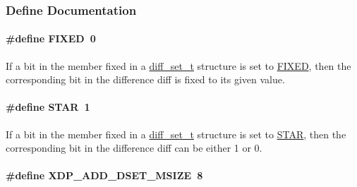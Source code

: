 \subsubsection{\-Define \-Documentation}
\hypertarget{xdp-add-diff-set_8hh_a20207ffc8e6f0bdcefb5c42a5b5c3fb8}{
\paragraph[{\-F\-I\-X\-E\-D}]{\setlength{\rightskip}{0pt plus 5cm}\#define {\bf \-F\-I\-X\-E\-D}~0}}\label{xdp-add-diff-set_8hh_a20207ffc8e6f0bdcefb5c42a5b5c3fb8}
\-If a bit in the member {\ttfamily fixed} in a \hyperlink{structdiff__set__t}{diff\-\_\-set\-\_\-t} structure is set to \hyperlink{xdp-add-diff-set_8hh_a20207ffc8e6f0bdcefb5c42a5b5c3fb8}{\-F\-I\-X\-E\-D}, then the corresponding bit in the difference {\ttfamily diff} is fixed to its given value. \hypertarget{xdp-add-diff-set_8hh_a94c3dc9846edbbb70f678768633a4796}{
\paragraph[{\-S\-T\-A\-R}]{\setlength{\rightskip}{0pt plus 5cm}\#define {\bf \-S\-T\-A\-R}~1}}\label{xdp-add-diff-set_8hh_a94c3dc9846edbbb70f678768633a4796}
\-If a bit in the member {\ttfamily fixed} in a \hyperlink{structdiff__set__t}{diff\-\_\-set\-\_\-t} structure is set to \hyperlink{xdp-add-diff-set_8hh_a94c3dc9846edbbb70f678768633a4796}{\-S\-T\-A\-R}, then the corresponding bit in the difference {\ttfamily diff} can be either 1 or 0. \hypertarget{xdp-add-diff-set_8hh_aa108899befe543f21add3d4ded7874c1}{
\paragraph[{\-X\-D\-P\-\_\-\-A\-D\-D\-\_\-\-D\-S\-E\-T\-\_\-\-M\-S\-I\-Z\-E}]{\setlength{\rightskip}{0pt plus 5cm}\#define {\bf \-X\-D\-P\-\_\-\-A\-D\-D\-\_\-\-D\-S\-E\-T\-\_\-\-M\-S\-I\-Z\-E}~8}}\label{xdp-add-diff-set_8hh_aa108899befe543f21add3d4ded7874c1}
